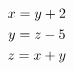 \documentclass{article}
\begin{document}
\vspace*{\fill} \vspace*{-5ex}
\begin{gather}
x = y + 2 \\ 
y = z - 5 \notag \\
z = x + y
\end{gather}
\vspace*{\fill}
\end{document}
